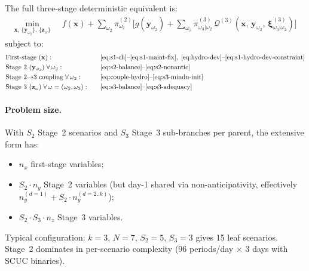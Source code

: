 \documentclass[11pt]{article}
\begin{document}
The full three-stage deterministic equivalent is:
\begin{equation}\label{eq:extensive}
\boxed{
\begin{aligned}
  \min_{\mathbf{x},\,
    \{\mathbf{y}_{\omega_2}\},\,
    \{\mathbf{z}_{\omega}\}}
  \;\;
  & f(\mathbf{x})
  + \sum_{\omega_2} \pi^{(2)}_{\omega_2}
    \Biggl[
      g(\mathbf{y}_{\omega_2})
      + \sum_{\omega_3} \pi^{(3)}_{\omega_3|\omega_2}\,
        \mathcal{Q}^{(3)}(\mathbf{x},\,\mathbf{y}_{\omega_2},\,
          \boldsymbol{\xi}^{(3)}_{\omega_3|\omega_2})
    \Biggr]
\end{aligned}
}
\end{equation}
subject to:
\begin{alignat}{2}
  &\text{First-stage } (\mathbf{x}):
    \quad&&\eqref{eq:s1-ch}\text{--}\eqref{eq:s1-maint-fix},\;
    \eqref{eq:hydro-dev}\text{--}\eqref{eq:s1-hydro-dev-constraint}
    \notag\\
  &\text{Stage~2 } (\mathbf{y}_{\omega_2})\; \forall\,\omega_2:
    \quad&&\eqref{eq:s2-balance}\text{--}\eqref{eq:s2-nonantic}
    \notag\\
  &\text{Stage~2$\to$3 coupling}\; \forall\,\omega_2:
    \quad&&\eqref{eq:couple-hydro}\text{--}\eqref{eq:s3-mindn-init}
    \notag\\
  &\text{Stage~3 } (\mathbf{z}_\omega)\;
    \forall\,\omega = (\omega_2, \omega_3):
    \quad&&\eqref{eq:s3-balance}\text{--}\eqref{eq:s3-adequacy}
    \notag
\end{alignat}

\paragraph{Problem size.}
With $S_2$ Stage~2 scenarios and $S_3$ Stage~3 sub-branches per
parent, the extensive form has:
\begin{itemize}[nosep]
  \item $n_x$ first-stage variables;
  \item $S_2 \cdot n_y$ Stage~2 variables (but day-1 shared via
        non-anticipativity, effectively
        $n_y^{(d=1)} + S_2 \cdot n_y^{(d=2..k)}$);
  \item $S_2 \cdot S_3 \cdot n_z$ Stage~3 variables.
\end{itemize}
Typical configuration: $k=3$, $N=7$, $S_2 = 5$, $S_3 = 3$ gives 15
leaf scenarios. Stage~2 dominates in per-scenario complexity (96
periods/day $\times$ 3 days with SCUC binaries).

\end{document}
